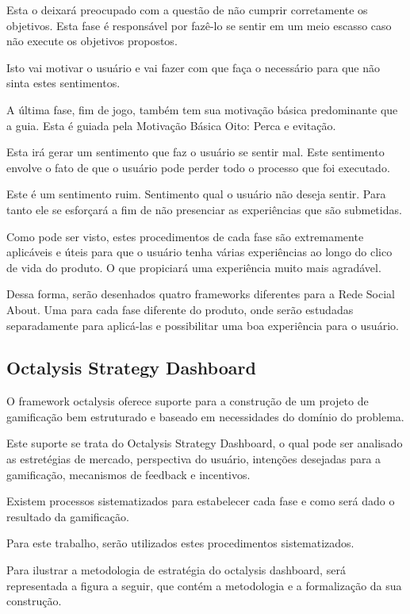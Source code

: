 Esta o deixará preocupado com a questão de não cumprir corretamente os objetivos.
Esta fase é responsável por fazê-lo se sentir em um meio escasso caso não execute
os objetivos propostos.

Isto vai motivar o usuário e vai fazer com que faça o necessário para que não
sinta estes sentimentos.

A última fase, fim de jogo, também tem sua motivação básica predominante que
a guia. Esta é guiada pela Motivação Básica Oito: Perca e evitação.

Esta irá gerar um sentimento que faz o usuário se sentir mal. Este sentimento
envolve o fato de que o usuário pode perder todo o processo que foi executado.



Este é um sentimento ruim. Sentimento qual o usuário não deseja sentir. Para tanto
ele se esforçará a fim de não presenciar as experiências que são submetidas.

Como pode ser visto, estes procedimentos de cada fase são extremamente aplicáveis
e úteis para que o usuário tenha várias experiências ao longo do clico de vida do
produto. O que propiciará uma experiência muito mais agradável.

Dessa forma, serão desenhados quatro frameworks diferentes para a Rede Social About.
Uma para cada fase diferente do produto, onde serão estudadas separadamente para
aplicá-las e possibilitar uma boa experiência para o usuário.

\subsection{Octalysis Strategy Dashboard}
\label{sec:octalysisdashborad}
O framework octalysis oferece suporte para a construção de um projeto de gamificação
bem estruturado e baseado em necessidades do domínio do problema.

Este suporte se trata do Octalysis Strategy Dashboard, o qual pode ser analisado
 as
estretégias de mercado, perspectiva do usuário, intenções desejadas para a gamificação,
mecanismos de feedback e incentivos.

Existem processos sistematizados para estabelecer cada fase e como será dado o
resultado da gamificação.

Para este trabalho, serão utilizados estes procedimentos sistematizados.

Para ilustrar a metodologia de estratégia do octalysis dashboard, será representada
a figura a seguir, que contém a metodologia e a formalização da sua construção.

